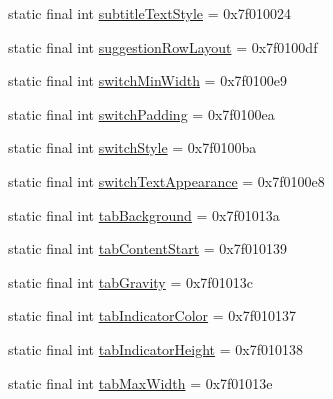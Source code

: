 \begin{CompactItemize}
\item 
static final int \hyperlink{classandroid_1_1support_1_1graphics_1_1drawable_1_1animated_1_1_r_1_1attr_22d0177adb9fcefdff72bb7b55bd8e9e}{subtitleTextStyle} = 0x7f010024
\item 
static final int \hyperlink{classandroid_1_1support_1_1graphics_1_1drawable_1_1animated_1_1_r_1_1attr_a340ba3cde7d8b5e7d416adb5bdc4822}{suggestionRowLayout} = 0x7f0100df
\item 
static final int \hyperlink{classandroid_1_1support_1_1graphics_1_1drawable_1_1animated_1_1_r_1_1attr_b4e1d31ed0ea4e6cbaf833df6f063c0b}{switchMinWidth} = 0x7f0100e9
\item 
static final int \hyperlink{classandroid_1_1support_1_1graphics_1_1drawable_1_1animated_1_1_r_1_1attr_da78a455e03d0f355658709f686cd489}{switchPadding} = 0x7f0100ea
\item 
static final int \hyperlink{classandroid_1_1support_1_1graphics_1_1drawable_1_1animated_1_1_r_1_1attr_db5e8b58645d27cef66a096719f4f8b6}{switchStyle} = 0x7f0100ba
\item 
static final int \hyperlink{classandroid_1_1support_1_1graphics_1_1drawable_1_1animated_1_1_r_1_1attr_4caa3232d1cd3c4cec06f534d1fd2157}{switchTextAppearance} = 0x7f0100e8
\item 
static final int \hyperlink{classandroid_1_1support_1_1graphics_1_1drawable_1_1animated_1_1_r_1_1attr_b031cf1b338ec197cad986be890fa14c}{tabBackground} = 0x7f01013a
\item 
static final int \hyperlink{classandroid_1_1support_1_1graphics_1_1drawable_1_1animated_1_1_r_1_1attr_c7b124ad0b70da95de1156997cd09d5b}{tabContentStart} = 0x7f010139
\item 
static final int \hyperlink{classandroid_1_1support_1_1graphics_1_1drawable_1_1animated_1_1_r_1_1attr_c251b7e60c41fccac7efb337640e2128}{tabGravity} = 0x7f01013c
\item 
static final int \hyperlink{classandroid_1_1support_1_1graphics_1_1drawable_1_1animated_1_1_r_1_1attr_b5a08ca4840b92a4626f8c36cd0f0fc6}{tabIndicatorColor} = 0x7f010137
\item 
static final int \hyperlink{classandroid_1_1support_1_1graphics_1_1drawable_1_1animated_1_1_r_1_1attr_c65360b7e2b40c73a880a2b6ff895119}{tabIndicatorHeight} = 0x7f010138
\item 
static final int \hyperlink{classandroid_1_1support_1_1graphics_1_1drawable_1_1animated_1_1_r_1_1attr_8fa8b3690ae2e389a4d3f6f5ab73f8b0}{tabMaxWidth} = 0x7f01013e
\item 

\end{CompactItemize}
